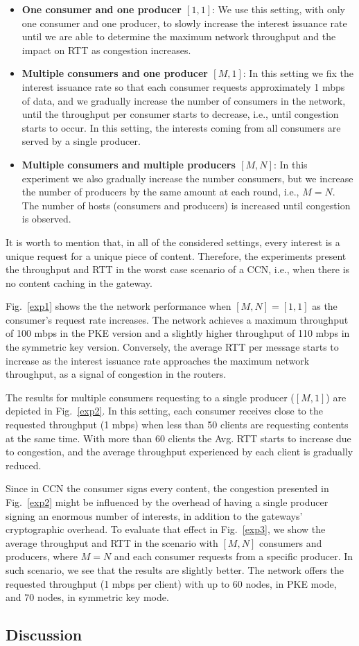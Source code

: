 \begin{itemize}
 \item \textbf{One consumer and one producer $[1,1]$}: We use this setting, with only one consumer and one producer, to slowly increase the interest issuance rate until we are able to determine the maximum network throughput and the impact on RTT as congestion increases.
 \item \textbf{Multiple consumers and one producer $[M,1]$}: In this setting we fix the interest issuance rate so that each consumer requests approximately 1 mbps of data, and we gradually increase the number of consumers in the network, until the throughput per consumer starts to decrease, i.e., until congestion starts to occur. In this setting, the interests coming from all consumers are served by a single producer.  
 \item \textbf{Multiple consumers and multiple producers $[M,N]$}: In this experiment we also gradually increase the number consumers, but we increase the number of producers by the same amount at each round, i.e., $M=N$. The number of hosts (consumers and producers) is increased until congestion is observed.
\end{itemize}

It is worth to mention that, in all of the considered settings, every interest is a unique request for a unique piece of content. Therefore, the experiments present the throughput and RTT in the worst case scenario of a CCN, i.e., when there is no content caching in the gateway.

Fig.~\ref{exp1} shows the the network performance when $[M,N]=[1,1]$ as the consumer's request rate increases. The network achieves a maximum throughput of 100 mbps in the PKE version and a
slightly higher throughput of 110 mbps in the symmetric key version. Conversely, the average RTT per message starts to increase as the interest issuance rate approaches the maximum network throughput, as a signal of congestion in the routers.

The results for multiple consumers requesting to a single producer ($[M,1]$) are depicted in Fig.~\ref{exp2}.
In this setting, each consumer receives close to the requested throughput (1 mbps) when less than 50 clients are requesting contents at the same time.
With more than 60 clients the Avg. RTT starts to increase due to congestion, and the average throughput experienced by each client is gradually reduced.

Since in CCN the consumer signs every content, the congestion presented in Fig.~\ref{exp2} might be influenced by the overhead of having a single producer signing an enormous number of interests, in addition to the gateways' cryptographic overhead.
To evaluate that effect in Fig.~\ref{exp3}, we show the average throughput and RTT in the scenario with $[M,N]$ consumers and producers, where $M=N$ and each consumer requests from a specific producer.
In such scenario, we see that the results are slightly better. The network offers the requested throughput (1 mbps per client) with up to 60 nodes, in PKE mode, and 70 nodes, in symmetric key mode.


\subsection{Discussion}


